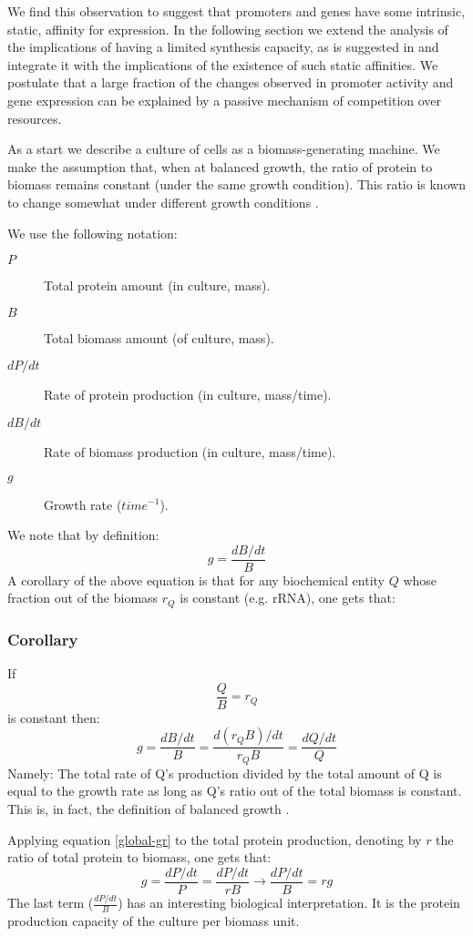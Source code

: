 \documentclass[a4page]{report}
\begin{document}
We find this observation to suggest that promoters and genes have some intrinsic, static, affinity for expression.
In the following section we extend the analysis of the implications of having a limited synthesis capacity, as is suggested in \cite{Leeat2013} and integrate it with the implications of the existence of such static affinities.
We postulate that a large fraction of the changes observed in promoter activity and gene expression can be explained by a passive mechanism of competition over resources.

As a start we describe a culture of cells as a biomass-generating machine.
We make the assumption that, when at balanced growth, the ratio of protein to biomass remains constant (under the same growth condition).
This ratio is known to change somewhat under different growth conditions \cite{Bremer1987}.

We use the following notation:
\begin{description}
\item[$P$] Total protein amount (in culture, mass).
\item[$B$] Total biomass amount (of culture, mass).
\item [$dP/dt$] Rate of protein production (in culture, mass/time).
\item [$dB/dt$] Rate of biomass production (in culture, mass/time).
\item [$g$] Growth rate ($time^{-1}$).
\end{description}
We note that by definition:
\[ g=\frac{dB/dt}{B}\]
A corollary of the above equation is that for any biochemical entity $Q$ whose fraction out of the biomass $r_Q$ is constant (e.g. rRNA), one gets that:
\subsubsection{Corollary}
If
\[\frac{Q}{B}=r_Q\]
is constant then:
\begin{equation}
\label{global-gr}
g=\frac{dB/dt}{B}=\frac{d(r_QB)/dt}{r_QB}=\frac{dQ/dt}{Q}
\end{equation}
Namely: The total rate of Q's production divided by the total amount of Q is equal to the growth rate as long as Q's ratio out of the total biomass is constant.
This is, in fact, the definition of balanced growth \cite{Campbell1957}.

Applying equation \ref{global-gr} to the total protein production, denoting by $r$ the ratio of total protein to biomass, one gets that:
\[g=\frac{dP/dt}{P}=\frac{dP/dt}{rB}\rightarrow\frac{dP/dt}{B}=rg\]
The last term ($\frac{dP/dt}{B}$) has an interesting biological interpretation.
It is the protein production capacity of the culture per biomass unit.
\end{document}

